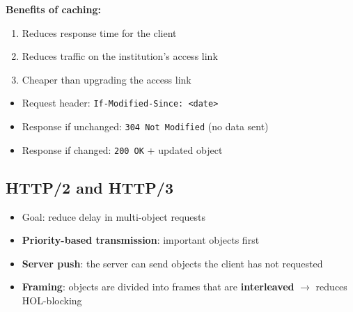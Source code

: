 \begin{center}
\end{center}

\textbf{Benefits of caching:}
\begin{enumerate}[noitemsep]
    \item Reduces response time for the client
    \item Reduces traffic on the institution's access link
    \item Cheaper than upgrading the access link
\end{enumerate}

\begin{imagebox}
\end{imagebox}

\begin{keybox}
\begin{itemize}[noitemsep]
    \item Request header: \texttt{If-Modified-Since: <date>}
    \item Response if unchanged: \texttt{304 Not Modified} (no data sent)
    \item Response if changed: \texttt{200 OK} + updated object
\end{itemize}
\end{keybox}

\subsection{HTTP/2 and HTTP/3}

\begin{keybox}
\begin{itemize}[noitemsep]
    \item Goal: reduce delay in multi-object requests
    \item \textbf{Priority-based transmission}: important objects first
    \item \textbf{Server push}: the server can send objects the client has not requested
    \item \textbf{Framing}: objects are divided into frames that are \textbf{interleaved} $\rightarrow$ reduces HOL-blocking
\end{itemize}
\end{keybox}

